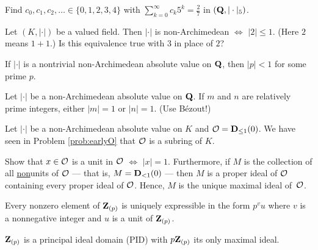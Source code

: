 \begin{prob}\label{prob:32}  Find $c_0, c_1, c_2, \ldots \in \{0,1,2,3,4\}$ with $\sum_{k=0}^{\infty} c_k 5^k = \frac27$ in $(\mathbf{Q},|\cdot|_{5})$.
\end{prob}


\absval
\begin{prob}\label{ex:archchar}\label{prob:34} Let $(K,|\cdot|)$ be a valued field. Then $|\cdot|$ is non-Archimedean $\Longleftrightarrow$ $|2| \le 1$. (Here $2$ means $1+1$.) Is this equivalence true with $3$ in place of $2$?
\end{prob}

\begin{prob}\label{prob:35} If $|\cdot|$ is a nontrivial non-Archimedean absolute value on $\mathbf{Q}$, then $|p| < 1$ for some prime $p$.
\end{prob}

\begin{prob}\label{prob:36} Let $|\cdot|$ be a non-Archimedean absolute value on $\mathbf{Q}$. If $m$ and $n$ are relatively prime integers, either $|m| = 1$ or $|n| = 1$. (Use Bézout!)


\end{prob}

\begin{prob}\label{ex:localization}\label{prob:37} Let $|\cdot|$ be a non-Archimedean absolute value on $K$ and $\mathcal{O}= \mathbf{D}_{\le 1}(0)$. We have seen in Problem \ref{prob:earlyO} that $\mathcal{O}$ is a subring of $K$. 

Show that $x \in \mathcal{O}$ is a unit in $\mathcal{O}$ $\Longleftrightarrow$ $|x| = 1$. Furthermore, if $M$ is the collection of all \underline{non}units of $\mathcal{O}$ --- that is, $M = \mathbf{D}_{<1}(0)$ --- then $M$ is a proper ideal of $\mathcal{O}$ containing every proper ideal of $\mathcal{O}$. Hence, $M$ is the unique maximal ideal of~$\mathcal{O}$. 
\end{prob}

\begin{prob}\label{prob:38} Every nonzero element of $\mathbf{Z}_{(p)}$ is uniquely expressible in the form $p^{v} u$ where $v$ is a nonnegative integer and $u$ is a unit of $\mathbf{Z}_{(p)}$.
\end{prob}

\begin{prob}\label{prob:39}$\mathbf{Z}_{(p)}$ is a principal ideal domain (PID) with $p\mathbf{Z}_{(p)}$ its only maximal ideal.
\end{prob}

